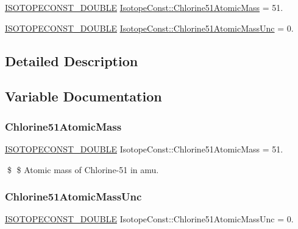\begin{DoxyCompactItemize}
\item 
\mbox{\hyperlink{group___isotope_const-_macros_ga8f45a7272ce02c0b4c65c44636ed719a}{I\+S\+O\+T\+O\+P\+E\+C\+O\+N\+S\+T\+\_\+\+D\+O\+U\+B\+LE}} \mbox{\hyperlink{group___isotope_const-_chlorine-_cl51_gaecbbc482b8ad1b8276a64af5a3f6505d}{Isotope\+Const\+::\+Chlorine51\+Atomic\+Mass}} = 51.
\item 
\mbox{\hyperlink{group___isotope_const-_macros_ga8f45a7272ce02c0b4c65c44636ed719a}{I\+S\+O\+T\+O\+P\+E\+C\+O\+N\+S\+T\+\_\+\+D\+O\+U\+B\+LE}} \mbox{\hyperlink{group___isotope_const-_chlorine-_cl51_ga3a11c2fcfac82af53429ce9cb1dce55d}{Isotope\+Const\+::\+Chlorine51\+Atomic\+Mass\+Unc}} = 0.
\end{DoxyCompactItemize}


\subsection{Detailed Description}


\subsection{Variable Documentation}
\mbox{\label{group___isotope_const-_chlorine-_cl51_gaecbbc482b8ad1b8276a64af5a3f6505d}} 
\subsubsection{\texorpdfstring{Chlorine51\+Atomic\+Mass}{Chlorine51AtomicMass}}
{\footnotesize\ttfamily \mbox{\hyperlink{group___isotope_const-_macros_ga8f45a7272ce02c0b4c65c44636ed719a}{I\+S\+O\+T\+O\+P\+E\+C\+O\+N\+S\+T\+\_\+\+D\+O\+U\+B\+LE}} Isotope\+Const\+::\+Chlorine51\+Atomic\+Mass = 51.}

\$ \$ Atomic mass of Chlorine-\/51 in amu. \mbox{\label{group___isotope_const-_chlorine-_cl51_ga3a11c2fcfac82af53429ce9cb1dce55d}} 
\subsubsection{\texorpdfstring{Chlorine51\+Atomic\+Mass\+Unc}{Chlorine51AtomicMassUnc}}
{\footnotesize\ttfamily \mbox{\hyperlink{group___isotope_const-_macros_ga8f45a7272ce02c0b4c65c44636ed719a}{I\+S\+O\+T\+O\+P\+E\+C\+O\+N\+S\+T\+\_\+\+D\+O\+U\+B\+LE}} Isotope\+Const\+::\+Chlorine51\+Atomic\+Mass\+Unc = 0.}

